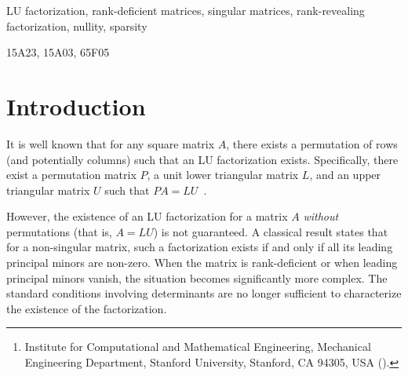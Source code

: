\documentclass[final]{siamart1116}
\title{\TheTitle}
\author{\TheAuthors\thanks{Institute for Computational and Mathematical Engineering,
    Mechanical Engineering Department, Stanford University,
    Stanford, CA 94305, USA (\email{darve@stanford.edu}).}}
\numberwithin{theorem}{section}
\begin{document}
\maketitle

\begin{abstract}
  We establish necessary and sufficient conditions for the existence of an LU factorization $A=LU$ of an arbitrary square matrix $A$ with entries in a field $F$, including rank-deficient cases, without row or column permutations. We prove that such a factorization exists if and only if the nullity of every leading principal submatrix is bounded by the sum of the nullities of the corresponding leading column and row blocks. Building on the work of Okunev and Johnson, we present simpler, constructive proofs. Furthermore, we extend these results to characterize rank-revealing factorizations, providing explicit sparsity bounds for the factors $L$ and $U$. Finally, we derive analogous necessary and sufficient conditions for the existence of factorizations with unit lower or unit upper triangular factors.
\end{abstract}

\begin{keywords}
  LU factorization, rank-deficient matrices, singular matrices, rank-revealing factorization, nullity, sparsity
\end{keywords}
\begin{AMS}
  15A23, 15A03, 65F05
\end{AMS}

\section{Introduction}
It is well known that for any square matrix $A$, there exists a permutation of rows (and potentially columns) such that an LU factorization exists. Specifically, there exist a permutation matrix $P$, a unit lower triangular matrix $L$, and an upper triangular matrix $U$ such that $PA = LU$~\cite{higham_gaussian_2011,lu_numerical_2021}.

However, the existence of an LU factorization for a matrix $A$ \emph{without} permutations (that is, $A = LU$) is not guaranteed. A classical result states that for a non-singular matrix, such a factorization exists if and only if all its leading principal minors are non-zero. When the matrix is rank-deficient or when leading principal minors vanish, the situation becomes significantly more complex. The standard conditions involving determinants are no longer sufficient to characterize the existence of the factorization.
\end{document}
